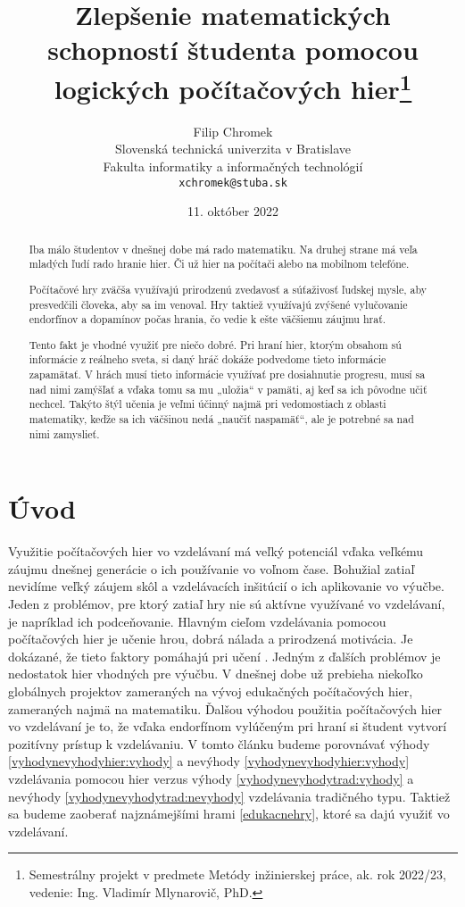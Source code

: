 \documentclass[10pt,twoside,slovak,a4paper]{article}
\title{Zlepšenie matematických schopností študenta pomocou logických počítačových hier\thanks{Semestrálny projekt v predmete Metódy inžinierskej práce, ak. rok 2022/23, vedenie: Ing. Vladimír Mlynarovič, PhD.}} %
\author{Filip Chromek\\[2pt]
	{\small Slovenská technická univerzita v Bratislave}\\
	{\small Fakulta informatiky a informačných technológií}\\
	{\small \texttt{xchromek@stuba.sk}}
	}
\date{\small 11. október 2022} %
\begin{document}
\maketitle

\begin{abstract}

Iba málo študentov v dnešnej dobe má rado matematiku. Na druhej strane má veľa mladých ľudí rado hranie hier. Či už hier na počítači alebo na mobilnom telefóne.

Počítačové hry zväčša využívajú prirodzenú zvedavosť a súťaživosť ľudskej mysle, aby presvedčili človeka, aby sa im venoval. Hry taktiež využívajú zvýšené vylučovanie endorfínov a dopamínov počas hrania, čo vedie k ešte väčšiemu záujmu hrať.

Tento fakt je vhodné využiť pre niečo dobré. Pri hraní hier, ktorým obsahom sú informácie z reálneho sveta, si daný hráč dokáže podvedome tieto informácie zapamätať. V hrách musí tieto informácie využívať pre dosiahnutie progresu, musí sa nad nimi zamýšľať a vďaka tomu sa mu „uložia“ v pamäti, aj keď sa ich pôvodne učiť nechcel. Takýto štýl učenia je veľmi účinný najmä pri vedomostiach z oblasti matematiky, keďže sa ich väčšinou nedá „naučiť naspamäť“, ale je potrebné sa nad nimi zamyslieť.
\end{abstract}



\section{Úvod}


Využitie počítačových hier vo vzdelávaní má veľký potenciál vďaka veľkému záujmu dnešnej generácie o ich používanie vo voľnom čase. Bohužial zatiaľ nevidíme veľký záujem skôl a vzdelávacích inšitúcií o ich aplikovanie vo výučbe. Jeden z problémov, pre ktorý zatiaľ hry nie sú aktívne využívané vo vzdelávaní, je napríklad ich podceňovanie. Hlavným cieľom vzdelávania pomocou počítačových hier je učenie hrou, dobrá nálada a prirodzená motivácia. Je dokázané, že tieto faktory pomáhajú pri učení \cite{stranka1}. Jedným z ďalších problémov je nedostatok hier vhodných pre výučbu. V dnešnej dobe už prebieha niekoľko globálnych projektov\cite{stranka1} zameraných na vývoj edukačných počítačových hier, zameraných najmä na matematiku. Ďalšou výhodou použitia počítačových hier vo vzdelávaní je to, že vďaka endorfínom vylúčeným pri hraní si študent vytvorí pozitívny prístup k vzdelávaniu. 
V tomto článku budeme porovnávať výhody \ref{vyhodynevyhodyhier:vyhody} a nevýhody \ref{vyhodynevyhodyhier:vyhody} vzdelávania pomocou hier verzus výhody \ref{vyhodynevyhodytrad:vyhody} a nevýhody \ref{vyhodynevyhodytrad:nevyhody} vzdelávania tradičného typu. Taktiež sa budeme zaoberať najznámejšími hrami \ref{edukacnehry}, ktoré sa dajú využiť vo vzdelávaní.
\end{document}
